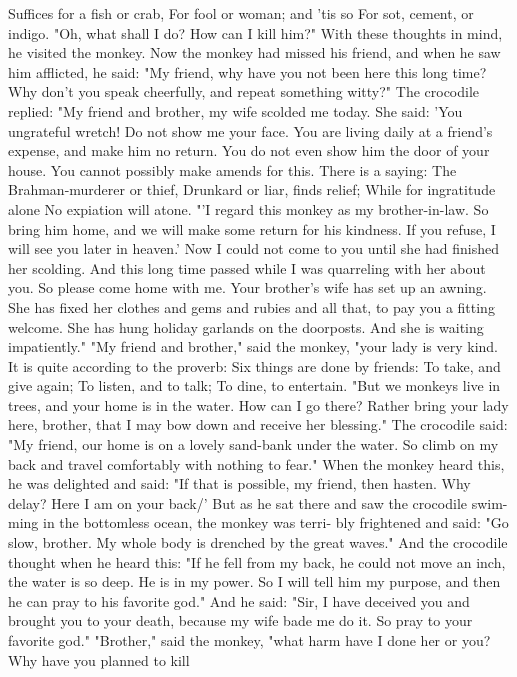 \documentclass{book}
\begin{document}
Suffices for a fish or crab,
For fool or woman; and 'tis so
For sot, cement, or indigo.
"Oh, what shall I do? How can I kill him?" With
these thoughts in mind, he visited the monkey.
Now the monkey had missed his friend, and when
he saw him afflicted, he said: "My friend, why have
you not been here this long time? Why don't you
speak cheerfully, and repeat something witty?"
The crocodile replied: "My friend and brother,
my wife scolded me today. She said: 'You ungrateful
wretch! Do not show me your face. You are living
daily at a friend's expense, and make him no return.
You do not even show him the door of your house.
You cannot possibly make amends for this. There is
a saying:
The Brahman-murderer or thief,
Drunkard or liar, finds relief;
While for ingratitude alone
No expiation will atone.
"'I regard this monkey as my brother-in-law. So
bring him home, and we will make some return for
his kindness. If you refuse, I will see you later in
heaven.' Now I could not come to you until she had
finished her scolding. And this long time passed while
I was quarreling with her about you. So please come
home with me. Your brother's wife has set up an
awning. She has fixed her clothes and gems and
rubies and all that, to pay you a fitting welcome. She
has hung holiday garlands on the doorposts. And
she is waiting impatiently."
"My friend and brother," said the monkey,
"your lady is very kind. It is quite according to the
proverb:
Six things are done by friends:
To take, and give again;
To listen, and to talk;
To dine, to entertain.
"But we monkeys live in trees, and your home is
in the water. How can I go there? Rather bring
your lady here, brother, that I may bow down and
receive her blessing."
The crocodile said: "My friend, our home is on a
lovely sand-bank under the water. So climb on my
back and travel comfortably with nothing to fear."
When the monkey heard this, he was delighted
and said: "If that is possible, my friend, then hasten.
Why delay? Here I am on your back/'
But as he sat there and saw the crocodile swim-
ming in the bottomless ocean, the monkey was terri-
bly frightened and said: "Go slow, brother. My
whole body is drenched by the great waves."
And the crocodile thought when he heard this:
"If he fell from my back, he could not move an inch,
the water is so deep. He is in my power. So I will
tell him my purpose, and then he can pray to his
favorite god."
And he said: "Sir, I have deceived you and
brought you to your death, because my wife bade
me do it. So pray to your favorite god."
"Brother," said the monkey, "what harm have I
done her or you? Why have you planned to kill
\end{document}
